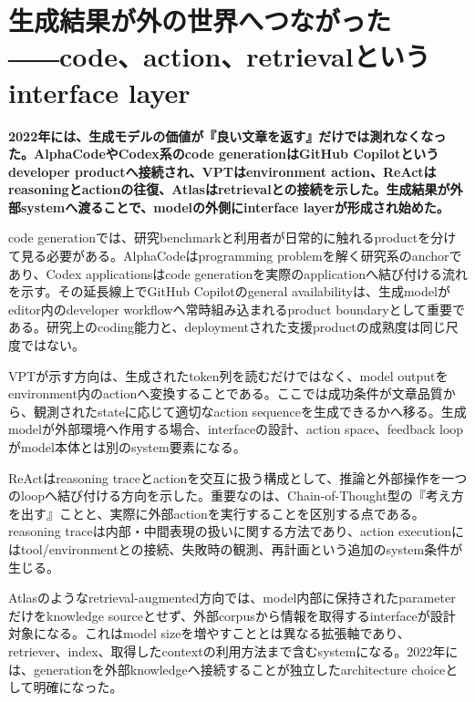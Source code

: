 \section{生成結果が外の世界へつながった――code、action、retrievalというinterface layer}
\noindent\textbf{2022年には、生成モデルの価値が『良い文章を返す』だけでは測れなくなった。AlphaCodeやCodex系のcode generationはGitHub Copilotというdeveloper productへ接続され、VPTはenvironment action、ReActはreasoningとactionの往復、Atlasはretrievalとの接続を示した。生成結果が外部systemへ渡ることで、modelの外側にinterface layerが形成され始めた。}\autocite{src-4e33c3e8216e,src-811e1008822e,src-8170b5e4c279,src-b1418e7ae779,src-d117f3860a91,src-dc0d76e03fc6}

code generationでは、研究benchmarkと利用者が日常的に触れるproductを分けて見る必要がある。AlphaCodeはprogramming problemを解く研究系のanchorであり、Codex applicationsはcode generationを実際のapplicationへ結び付ける流れを示す。その延長線上でGitHub Copilotのgeneral availabilityは、生成modelがeditor内のdeveloper workflowへ常時組み込まれるproduct boundaryとして重要である。研究上のcoding能力と、deploymentされた支援productの成熟度は同じ尺度ではない。\autocite{src-21b0842f98ec,src-8170b5e4c279,src-b1418e7ae779,src-dc0d76e03fc6}


VPTが示す方向は、生成されたtoken列を読むだけではなく、model outputをenvironment内のactionへ変換することである。ここでは成功条件が文章品質から、観測されたstateに応じて適切なaction sequenceを生成できるかへ移る。生成modelが外部環境へ作用する場合、interfaceの設計、action space、feedback loopがmodel本体とは別のsystem要素になる。\autocite{src-4e33c3e8216e,src-d117f3860a91}


ReActはreasoning traceとactionを交互に扱う構成として、推論と外部操作を一つのloopへ結び付ける方向を示した。重要なのは、Chain-of-Thought型の『考え方を出す』ことと、実際に外部actionを実行することを区別する点である。reasoning traceは内部・中間表現の扱いに関する方法であり、action executionにはtool/environmentとの接続、失敗時の観測、再計画という追加のsystem条件が生じる。\autocite{src-811e1008822e}


Atlasのようなretrieval-augmented方向では、model内部に保持されたparameterだけをknowledge sourceとせず、外部corpusから情報を取得するinterfaceが設計対象になる。これはmodel sizeを増やすこととは異なる拡張軸であり、retriever、index、取得したcontextの利用方法まで含むsystemになる。2022年には、generationを外部knowledgeへ接続することが独立したarchitecture choiceとして明確になった。\autocite{src-039e57a4916e}


